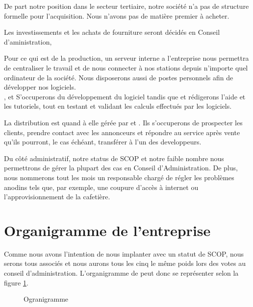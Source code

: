 			De part notre position dans le secteur tertiaire, notre société n'a pas de structure formelle pour l'acquisition.
			Nous n'avons pas de matière premier à acheter.

			Les investissements et les  achats de fourniture  seront décidés en Conseil d'aministration,

			Pour ce qui est de la production, un serveur interne a l'entreprise nous permettra de centraliser le travail et de nous connecter à nos stations
			depuis n'importe quel ordinateur de la société. Nous disposerons aussi de postes personnels afin de développer nos logiciels. \\
			\clem{}, \soum{} et \drm{} S'occuperons du développement du logiciel tandis que \ben{} et \bonte{} rédigerons l'aide et les tutoriels, tout en testant et 
			validant les calculs effectués par les logiciels.

			La distribution est quand à elle gérée par \bonte{} et \ben{}. Ils s'occuperons de prospecter les clients, prendre contact avec les annonceurs
			et répondre au service après vente qu'ils pourront, le cas échéant, transférer à l'un des developpeurs.

			Du côté administratif, notre status de SCOP et notre faible nombre nous permettrons de gérer la plupart des cas en Conseil d'Administration.
			De plus, nous nommerons tout les mois un responsable chargé de régler les problèmes anodins tels que, par exemple, une coupure d'accès à internet ou
			l'approvisionnement de la cafetière.
			
		\section{Organigramme de l'entreprise}
			Comme nous avons l'intention de nous implanter avec un statut de SCOP, nous serons tous associés et nous aurons 
			tous les cinq le même poids lors des votes au conseil d'administration. L'organigramme de \K{} peut donc se
			représenter selon la figure \ref{fig:org}.
			\begin{figure}[h]
			  \begin{center}
				
			  \end{center}
			  \caption{Ogranigramme}
			  \label{fig:org}
			\end{figure}
